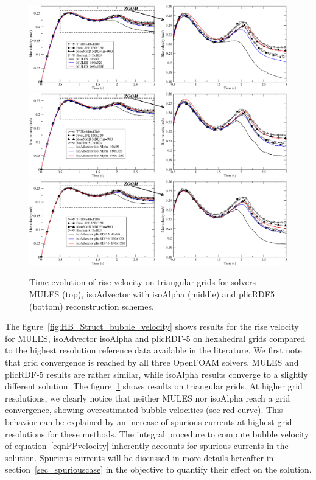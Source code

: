 \documentclass[review]{elsarticle}
\begin{document}
\begin{figure}[!h]
\begin{center}
 \vspace{-1mm}
 \includegraphics[width=\textwidth]{figures/HysingB-uns_bubble_velocity_MULES.pdf}
 \includegraphics[width=\textwidth]{figures/HysingB-uns_bubble_velocity_isoAlpha.pdf}
 \includegraphics[width=\textwidth]{figures/HysingB-uns_bubble_velocity_plicRDF5.pdf}
 \vspace{-14mm}
\end{center}
\caption{Time evolution of rise velocity on triangular grids for solvers MULES (top), isoAdvector with isoAlpha (middle) and plicRDF5 (bottom) reconstruction schemes.}
\label{fig:HB_Uns_bubble_velocity}
\end{figure}
 
The figure~\ref{fig:HB_Struct_bubble_velocity} shows results for the rise velocity for MULES, isoAdvector isoAlpha and plicRDF-5 on hexahedral grids compared to the highest resolution reference data available in the literature. We first note that grid convergence is reached by all three OpenFOAM solvers. MULES and plicRDF-5 results are rather similar, while isoAlpha results converge to a slightly different solution. The figure~\ref{fig:HB_Uns_bubble_velocity} shows results on triangular grids. At higher grid resolutions, we clearly notice that neither MULES nor isoAlpha reach a grid convergence, showing overestimated bubble velocities (see red curve). This behavior can be explained by an increase of spurious currents at highest grid resolutions for these methods. The integral procedure to compute bubble velocity of equation~\ref{eqnPPvelocity} inherently accounts for spurious currents in the solution. Spurious currents will be discussed in more details hereafter in section~\ref{sec_spuriouscase} in the objective to quantify their effect on the solution. 
\end{document}
